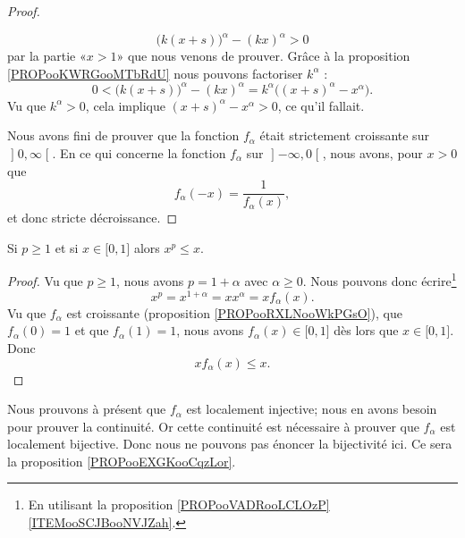 \begin{proof}
\begin{subproof}
            \begin{equation}
                \big( k(x+s) \big)^{\alpha}-(kx)^{\alpha}>0
            \end{equation}
            par la partie «\( x>1\)» que nous venons de prouver. Grâce à la proposition \ref{PROPooKWRGooMTbRdU} nous pouvons factoriser \( k^{\alpha}\) :
            \begin{equation}
                0<\big( k(x+s) \big)^{\alpha}-(kx)^{\alpha}=k^{\alpha}\big( (x+s)^{\alpha}-x^{\alpha} \big).
            \end{equation}
            Vu que \( k^{\alpha}>0\), cela implique \( (x+s)^{\alpha}-x^{\alpha}>0\), ce qu'il fallait.
    \end{subproof}
Nous avons fini de prouver que la fonction \( f_{\alpha}\) était strictement croissante sur \( \mathopen] 0 , \infty \mathclose[\). En ce qui concerne la fonction \( f_{\alpha}\) sur \( \mathopen] -\infty , 0 \mathclose[\), nous avons, pour \( x>0\) que
    \begin{equation}
        f_{\alpha}(-x)=\frac{1}{ f_{\alpha}(x) },
    \end{equation}
    et donc stricte décroissance.
\end{proof}

\begin{lemma}       \label{LEMooJVXQooDPUuuJ}
    Si \( p\geq 1\) et si \( x\in \mathopen[ 0 , 1 \mathclose]\) alors \( x^p\leq x\).
\end{lemma}

\begin{proof}
    Vu que \( p\geq 1\), nous avons \( p=1+\alpha\) avec \( \alpha\geq 0\). Nous pouvons donc écrire\footnote{En utilisant la proposition \ref{PROPooVADRooLCLOzP}\ref{ITEMooSCJBooNVJZah}.}
    \begin{equation}
        x^p=x^{1+\alpha}=xx^{\alpha}=xf_{\alpha}(x).
    \end{equation}
    Vu que \( f_{\alpha}\) est croissante (proposition \ref{PROPooRXLNooWkPGsO}), que \( f_{\alpha}(0)=1\) et que \( f_{\alpha}(1)=1\), nous avons \( f_{\alpha}(x)\in\mathopen[ 0 , 1 \mathclose]\) dès lors que \( x\in\mathopen[ 0 , 1 \mathclose]\). Donc
    \begin{equation}
        xf_{\alpha}(x)\leq x.
    \end{equation}
\end{proof}

Nous prouvons à présent que \( f_{\alpha}\) est localement injective; nous en avons besoin pour prouver la continuité. Or cette continuité est nécessaire à prouver que \( f_{\alpha}\) est localement bijective. Donc nous ne pouvons pas énoncer la bijectivité ici. Ce sera la proposition \ref{PROPooEXGKooCqzLor}.

